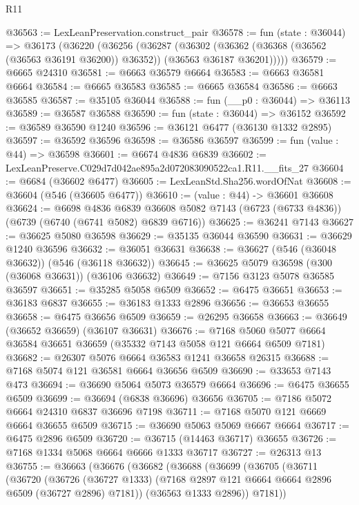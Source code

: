 \begin{lexlean}{R11}
\begin{coremodule}
@36563 := LexLeanPreservation.construct_pair
@36578 := fun (state : @36044) =>
  @36173
    (@36220
      (@36256
        (@36287
          (@36302
            (@36362 (@36368 (@36562 (@36563 @36191 @36200)) @36352))
            (@36563 @36187 @36201)))))
@36579 := @6665 @24310
@36581 := @6663 @36579 @6664
@36583 := @6663 @36581 @6664
@36584 := @6665 @36583
@36585 := @6665 @36584
@36586 := @6663 @36585
@36587 := @35105 @36044
@36588 := fun (__p0 : @36044) => @36113
@36589 := @36587 @36588
@36590 := fun (state : @36044) => @36152
@36592 := @36589 @36590 @1240
@36596 := @36121 @6477 (@36130 @1332 @2895)
@36597 := @36592 @36596
@36598 := @36586 @36597
@36599 := fun (value : @44) => @36598
@36601 := @6674 @4836 @6839
@36602 := LexLeanPreserve.C029d7d042ae895a2d072083090522ca1.R11.__fits_27
@36604 := @6684 (@36602 @6477)
@36605 := LexLeanStd.Sha256.wordOfNat
@36608 := @36604 (@546 (@36605 @6477))
@36610 := (value : @44) -> @36601 @36608
@36624 := @6698
    @4836
    @6839
    @36608
    @5082
    @7143
    (@6723 (@6733 @4836))
    (@6739 (@6740 (@6741 @5082) @6839 @6716))
@36625 := @36241 @7143
@36627 := @36625 @5080 @36598
@36629 := @35135 @36044 @36590
@36631 := @36629 @1240 @36596
@36632 := @36051 @36631
@36638 := @36627 (@546 (@36048 @36632)) (@546 (@36118 @36632))
@36645 := @36625 @5079 @36598 (@300 (@36068 @36631)) (@36106 @36632)
@36649 := @7156 @3123 @5078 @36585 @36597
@36651 := @35285 @5058 @6509
@36652 := @6475 @36651
@36653 := @36183 @6837
@36655 := @36183 @1333 @2896
@36656 := @36653 @36655
@36658 := @6475 @36656 @6509
@36659 := @26295 @36658
@36663 := @36649 (@36652 @36659) (@36107 @36631)
@36676 := @7168 @5060 @5077 @6664 @36584 @36651 @36659 (@35332 @7143 @5058 @121 @6664 @6509 @7181)
@36682 := @26307 @5076 @6664 @36583 @1241 @36658 @26315
@36688 := @7168 @5074 @121 @36581 @6664 @36656 @6509
@36690 := @33653 @7143 @473
@36694 := @36690 @5064 @5073 @36579 @6664
@36696 := @6475 @36655 @6509
@36699 := @36694 (@6838 @36696) @36656
@36705 := @7186 @5072 @6664 @24310 @6837 @36696 @7198
@36711 := @7168 @5070 @121 @6669 @6664 @36655 @6509
@36715 := @36690 @5063 @5069 @6667 @6664
@36717 := @6475 @2896 @6509
@36720 := @36715 (@14463 @36717) @36655
@36726 := @7168 @1334 @5068 @6664 @6666 @1333 @36717
@36727 := @26313 @13
@36755 := @36663
    (@36676
      (@36682
        (@36688
          (@36699
            (@36705
              (@36711
                (@36720
                  (@36726
                    (@36727 @1333)
                    (@7168 @2897 @121 @6664 @6664 @2896 @6509 (@36727 @2896) @7181))
                  (@36563 @1333 @2896))
                @7181))

\end{coremodule}
\end{lexlean}
